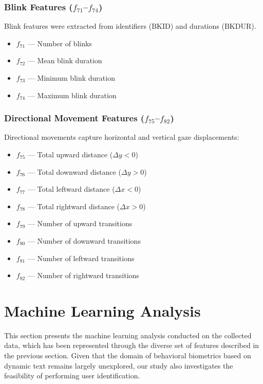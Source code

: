 \documentclass[12pt]{report}
\begin{document}
\subsection[Blink Features (f71–f74)]{Blink Features (\(f_{71}\)–\(f_{74}\))}

Blink features were extracted from identifiers (\(\mathrm{BKID}\)) and durations (\(\mathrm{BKDUR}\)).

\begin{itemize}
    \item \(f_{71}\) — Number of blinks
    \item \(f_{72}\) — Mean blink duration
    \item \(f_{73}\) — Minimum blink duration
    \item \(f_{74}\) — Maximum blink duration
\end{itemize}

\subsection[Directional Movement Features (f75–f82)]{Directional Movement Features (\(f_{75}\)–\(f_{82}\))}

Directional movements capture horizontal and vertical gaze displacements:

\begin{itemize}
    \item \(f_{75}\) — Total upward distance (\(\Delta y < 0\))
    \item \(f_{76}\) — Total downward distance (\(\Delta y > 0\))
    \item \(f_{77}\) — Total leftward distance (\(\Delta x < 0\))
    \item \(f_{78}\) — Total rightward distance (\(\Delta x > 0\))
    \item \(f_{79}\) — Number of upward transitions
    \item \(f_{80}\) — Number of downward transitions
    \item \(f_{81}\) — Number of leftward transitions
    \item \(f_{82}\) — Number of rightward transitions
\end{itemize}

\newpage

\chapter{Machine Learning Analysis}

This section presents the machine learning analysis conducted on the collected data, which has been represented through the diverse set of features described in the previous section. 
Given that the domain of behavioral biometrics based on dynamic text remains largely unexplored, our study also investigates the feasibility of performing user identification. 
\end{document}

